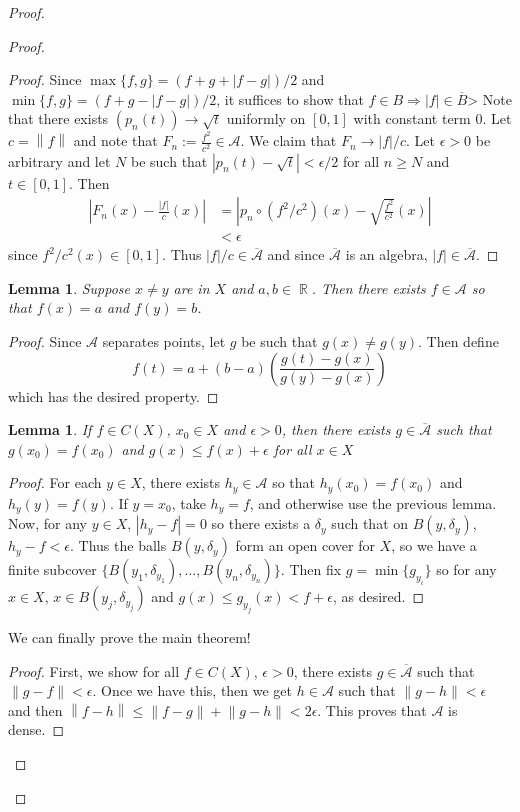 \documentclass[12pt, a4paper]{book}
\DeclareMathOperator{\R}{\mathbb{R}}
\newcommand{\norm}[1]{\left\lVert#1\right\rVert} %
\newtheorem{lemma}[theorem]{Lemma}
\theoremstyle{nonumberplain}
\newtheorem{proof}{Proof}
\begin{document}
\begin{proof}
\begin{proof}
\begin{proof}
    Since $\max\{f,g\}=(f+g+|f-g|)/2$ and $\min\{f,g\}=(f+g-|f-g|)/2$, it suffices to show that $f\in B\Rightarrow |f|\in\overline{B}$>
    Note that there exists $(p_n(t))\to\sqrt{t}$ uniformly on $[0,1]$ with constant term $0$.
    Let $c=\norm{f}$ and note that $F_n:=\frac{f^2}{c^2}\in\mathcal{A}$.
    We claim that $F_n\to |f|/c$.
    Let $\epsilon>0$ be arbitrary and let $N$ be such that $|p_n(t)-\sqrt{t}|<\epsilon/2$ for all $n\geq N$ and $t\in[0,1]$.
    Then
    \begin{align*}
        \left\lvert F_n(x)-\frac{|f|}{c}(x)\right\rvert &= \left\lvert p_n\circ (f^2/c^2)(x)-\sqrt{\frac{f^2}{c^2}}(x)\right\rvert\\
                                                        &<\epsilon
    \end{align*}
    since $f^2/c^2(x)\in[0,1]$.
    Thus $|f|/c\in\overline{\mathcal{A}}$ and since $\overline{\mathcal{A}}$ is an algebra, $|f|\in\overline{\mathcal{A}}$.
\end{proof}
\begin{lemma}
    Suppose $x\neq y$ are in $X$ and $a,b\in\R$.
    Then there exists $f\in\mathcal{A}$ so that $f(x)=a$ and $f(y)=b$.
\end{lemma}
\begin{proof}
    Since $\mathcal{A}$ separates points, let $g$ be such that $g(x)\neq g(y)$.
    Then define
    \[f(t)=a+(b-a)\left(\frac{g(t)-g(x)}{g(y)-g(x)}\right)\]
    which has the desired property.
\end{proof}
\begin{lemma}
    If $f\in C(X)$, $x_0\in X$ and $\epsilon>0$, then there exists $g\in\overline{\mathcal{A}}$ such that $g(x_0)=f(x_0)$ and $g(x)\leq f(x)+\epsilon$ for all $x\in X$
\end{lemma}
\begin{proof}
    For each $y\in X$, there exists $h_y\in \mathcal{A}$ so that $h_y(x_0)=f(x_0)$ and $h_y(y)=f(y)$.
    If $y=x_0$, take $h_y=f$, and otherwise use the previous lemma.
    Now, for any $y\in X$, $|h_y-f|=0$ so there exists a $\delta_y$ such that on $B(y,\delta_y)$, $h_y-f<\epsilon$.
    Thus the balls $B(y,\delta_y)$ form an open cover for $X$, so we have a finite subcover $\{B(y_1,\delta_{y_1}),\ldots,B(y_n,\delta_{y_n})\}$.
    Then fix $g=\min\{g_{y_i}\}$ so for any $x\in X$, $x\in B(y_j,\delta_{y_j})$ and $g(x)\leq g_{y_j}(x)<f+\epsilon$, as desired.
\end{proof}
We can finally prove the main theorem!
\begin{proof}
    First, we show for all $f\in C(X)$, $\epsilon>0$, there exists $g\in\overline{\mathcal{A}}$ such that $\norm{g-f}<\epsilon$.
    Once we have this, then we get $h\in\mathcal{A}$ such that $\norm{g-h}<\epsilon$ and then $\norm{f-h}\leq\norm{f-g}+\norm{g-h}<2\epsilon$.
    This proves that $\mathcal{A}$ is dense.


\end{proof}
\end{proof}
\end{proof}
\end{document}
